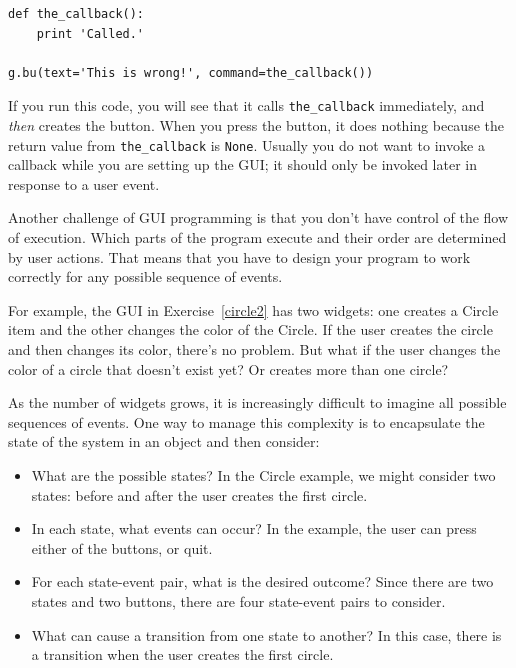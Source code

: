 \documentclass[10pt]{book}
\begin{document}
\beforeverb
\begin{verbatim}
def the_callback():
    print 'Called.'

g.bu(text='This is wrong!', command=the_callback())
\end{verbatim}
\afterverb
%
If you run this code, you will see that it calls \verb"the_callback"
immediately, and {\em then} creates the button.  When you press the
button, it does nothing because the return value from 
\verb"the_callback" is {\tt None}.
Usually you do not want to invoke a callback while you are
setting up the GUI; it should only be invoked later in response to
a user event.


Another challenge of GUI programming is that you don't have control
of the flow of execution.  Which parts of the program execute
and their order are determined by user actions.
That means that you have to design your program to work correctly
for any possible sequence of events.

For example, the GUI in Exercise~\ref{circle2} has two widgets:
one creates a Circle item and the other changes the color of the
Circle.  If the user creates the circle and then changes its color,
there's no problem.  But what if the user changes the color of
a circle that doesn't exist yet?  Or creates more than one circle?

As the number of widgets grows, it is increasingly difficult to
imagine all possible sequences of events.  One way to manage this 
complexity is to encapsulate the state of the system in an object
and then consider:

\begin{itemize}

\item What are the possible states?  In the Circle example, we
might consider two states: before and after the user creates the
first circle.

\item In each state, what events can occur?  In the example,
the user can press either of the buttons, or quit.

\item For each state-event pair, what is the desired outcome?
Since there are two states and two buttons, there are four
state-event pairs to consider.

\item What can cause a transition from one state to another?
In this case, there is a transition when the user creates
the first circle.

\end{itemize}
\end{document}

